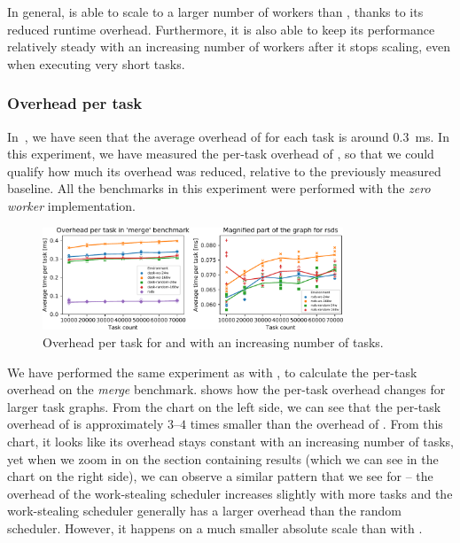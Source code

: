 In general, \rsds{} is able to scale to a larger number of workers than
\dask{}, thanks to its reduced runtime overhead. Furthermore, it is also able
to keep its performance relatively steady with an increasing number of workers after it stops
scaling, even when executing very short tasks.

\subsubsection*{Overhead per task}
In~, we have seen that the average overhead of
\dask{} for each task is around \SI{0.3}{\milli\second}. In this
experiment, we have measured the per-task overhead of \rsds{}, so that we could
qualify how much its overhead was reduced, relative to the previously measured baseline. All the
benchmarks in this experiment were performed with the \emph{zero worker} implementation.

\begin{figure}
	\centering
	\includegraphics[width=0.8\textwidth]{./imgs/rsds/charts/rsds-merge-task-scaling}
	\caption{Overhead per task for \rsds{} and \dask{} with an
	increasing number of tasks.}
	\label{fig:rsds-merge-task-scaling}
\end{figure}

We have performed the same experiment as with \dask{}, to calculate the
per-task overhead on the \emph{merge} benchmark.  shows
how the per-task overhead changes for larger task graphs. From the chart on the left side, we can
see that the per-task overhead of \rsds{} is approximately
$3$--$4$ times smaller than the overhead of
\dask{}. From this chart, it looks like its overhead stays constant with an
increasing number of tasks, yet when we zoom in on the section containing
\rsds{} results (which we can see in the chart on the right side), we can
observe a similar pattern that we see for \dask{} -- the overhead of the
work-stealing scheduler increases slightly with more tasks and the work-stealing scheduler
generally has a larger overhead than the random scheduler. However, it happens on a much smaller
absolute scale than with \dask{}.

